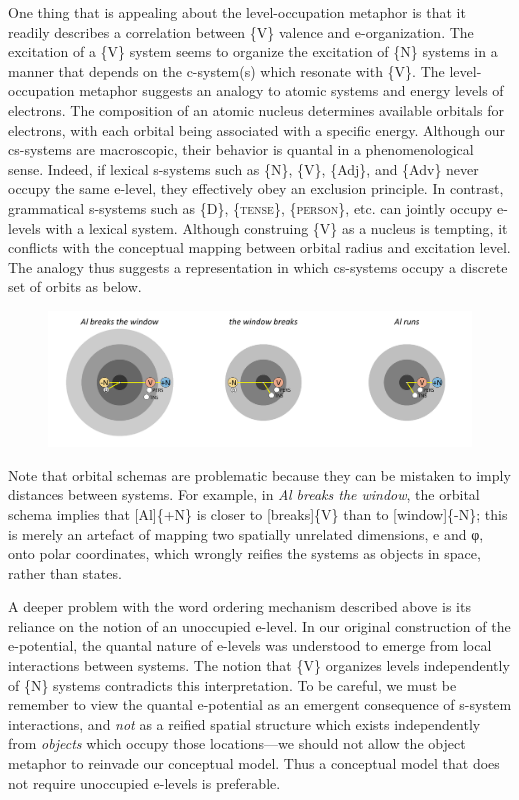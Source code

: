   One thing that is appealing about the level-occupation metaphor is that it readily describes a correlation between \{V\} valence and e-organization. The excitation of a \{V\} system seems to organize the excitation of \{N\} systems in a manner that depends on the c-system(s) which resonate with \{V\}. The level-occupation metaphor suggests an analogy to atomic systems and energy levels of electrons. The composition of an atomic nucleus determines available orbitals for electrons, with each orbital being associated with a specific energy. Although our cs-systems are macroscopic, their behavior is quantal in a phenomenological sense. Indeed, if lexical s-systems such as \{N\}, \{V\}, \{Adj\}, and \{Adv\} never occupy the same e-level, they effectively obey an exclusion principle. In contrast, grammatical s-systems such as \{D\}, \{\textsc{tense}\}, \{\textsc{person}\}, etc. can jointly occupy e-levels with a lexical system. Although construing \{V\} as a nucleus is tempting, it conflicts with the conceptual mapping between orbital radius and excitation level. The analogy thus suggests a representation in which cs-systems occupy a discrete set of orbits as below.

  
\begin{figure}
\includegraphics[width=\textwidth]{figures/Tilsen-img76.png}
\caption{\missingcaption}
\label{fig:}
\end{figure}
 

  Note that orbital schemas are problematic because they can be mistaken to imply distances between systems. For example, in \textit{Al breaks the window}, the orbital schema implies that [Al]\{+N\} is closer to [breaks]\{V\} than to [window]\{-N\}; this is merely an artefact of mapping two spatially unrelated dimensions, e and φ, onto polar coordinates, which wrongly reifies the systems as objects in space, rather than states.

  A deeper problem with the word ordering mechanism described above is its reliance on the notion of an unoccupied e-level. In our original construction of the e-potential, the quantal nature of e-levels was understood to emerge from local interactions between systems. The notion that \{V\} organizes levels independently of \{N\} systems contradicts this interpretation. To be careful, we must be remember to view the quantal e-potential as an emergent consequence of s-system interactions, and \textit{not} as a reified spatial structure which exists independently from \textit{objects} which occupy those locations—we should not allow the object metaphor to reinvade our conceptual model. Thus a conceptual model that does not require unoccupied e-levels is preferable.

